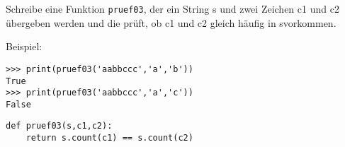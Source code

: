 \question[2] Schreibe eine Funktion \texttt{pruef03}, der ein String s und
zwei Zeichen c1 und c2 übergeben werden und die prüft, ob c1 und c2 gleich
häufig in svorkommen.

Beispiel:
\begin{lstlisting}
>>> print(pruef03('aabbccc','a','b'))
True
>>> print(pruef03('aabbccc','a','c'))
False

\end{lstlisting}
\begin{solutionbox}{4cm}
\begin{lstlisting}
def pruef03(s,c1,c2):
    return s.count(c1) == s.count(c2)
\end{lstlisting}
\end{solutionbox}
